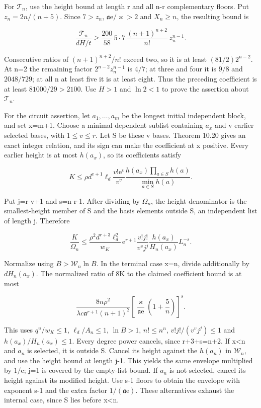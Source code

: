 \documentclass[
  11pt,
  a4paper,
]{article}
\begin{document}
For \(\mathcal T_n\), use the height bound at length r and all n-r
complementary floors. Put \(z_n=2n/(n+5)\). Since \(7>z_n\),
\(\mathfrak a\mathrm e/\varkappa>2\) and \(X_n\ge n\), the resulting
bound is

\[
\frac{\mathcal T_n}{dH/t}
\ge\frac{200}{58}\,5\cdot7\,
\frac{(n+1)^{n+2}}{n!}\,z_n^{n-1}.
\tag{10.478}
\]

Consecutive ratios of \((n+1)^{n+2}/n!\) exceed two, so it is at least
\((81/2)2^{n-2}\). At n=2 the remaining factor \(2^{n-2}z_n^{n-1}\) is
\(4/7\); at three and four it is \(9/8\) and \(2048/729\); at all n at
least five it is at least eight. Thus the preceding coefficient is at
least \(81000/29>2100\). Use \(H>1\) and \(\ln2<1\) to prove the
assertion about \(\mathcal T_n\).

For the circuit assertion, let \(a_1,\ldots,a_m\) be the longest initial
independent block, and set x=m+1. Choose a minimal dependent sublist
containing \(a_x\) and v earlier selected bases, with \(1\le v\le r\).
Let S be these v bases. Theorem 10.20 gives an exact integer relation,
and its sign can make the coefficient at x positive. Every earlier
height is at most \(h(a_x)\), so its coefficients satisfy

\[
K\le\rho d^{v+1}\ell_d\frac{v!\mathrm e^v}{v^v}
\frac{h(a_x)\prod_{a\in S}h(a)}{\min_{a\in S}h(a)}.
\tag{10.479}
\]

Put j=r-v+1 and s=n-r-1. After dividing by \(\Omega_n\), the height
denominator is the smallest-height member of S and the basis elements
outside S, an independent list of length j. Therefore

\[
\frac K{\Omega_n}\le
\frac{\rho^2d^{r+3}\ell_d^2}{w_K}\,
\mathrm e^{r+1}\frac{v!j!}{v^vj^j}
\frac{h(a_x)}{H_n(a_x)}L_n^{-s}.
\tag{10.480}
\]

Normalize using \(B>\mathcal W_n\ln B\). In the terminal case x=n,
divide additionally by \(dH_n(a_x)\). The normalized ratio of 8K to the
claimed coefficient bound is at most

\[
\frac{8n\rho^2}{\lambda c\mathfrak a^{r+1}(n+1)^2}
\left[\frac{\varkappa}{\mathfrak a\mathrm e}
             \left(1+\frac5n\right)\right]^s.
\tag{10.481}
\]

This uses \(q^u/w_K\le1\), \(\ell_d/A_n\le1\), \(\ln B>1\),
\(n!\le n^n\), \(v!j!/(v^vj^j)\le1\) and \(h(a_x)/H_n(a_x)\le1\). Every
degree power cancels, since r+3+s=n+2. If x\textless n and \(a_n\) is
selected, it is outside S. Cancel its height against the \(h(a_n)\) in
\(\mathcal W_n\), and use the height bound at length j-1. This yields
the same envelope multiplied by \(1/\mathrm e\); j=1 is covered by the
empty-list bound. If \(a_n\) is not selected, cancel its height against
its modified height. Use s-1 floors to obtain the envelope with exponent
s-1 and the extra factor \(1/(\mathfrak a\mathrm e)\). These
alternatives exhaust the internal case, since S lies before
x\textless n.
\end{document}
